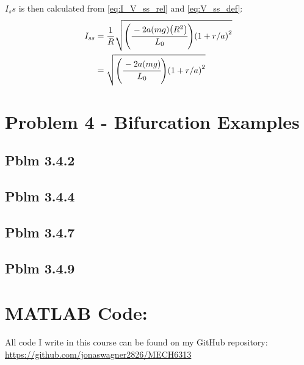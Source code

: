 \documentclass[letter]{article}
\begin{document}
$I_ss$ is then calculated from \eqref{eq:I_V_ss_rel} and \eqref{eq:V_ss_def}:
\begin{align}
	I_{ss}	&= \frac{1}{R} \sqrt{\qty(\cfrac{-2 a \qty(mg) \qty(R^2)}{L_0}) \qty(1+r/a)^2} \nonumber \\
			&= \sqrt{\qty(\cfrac{-2 a \qty(mg)}{L_0}) \qty(1+r/a)^2} \label{eq:I_ss_def}
\end{align}



\newpage
\section{Problem 4 - Bifurcation Examples}

\subsection{Pblm 3.4.2}



\subsection{Pblm 3.4.4}




\subsection{Pblm 3.4.7}




\subsection{Pblm 3.4.9}


\newpage
\appendix
\section{MATLAB Code:}
All code I write in this course can be found on my GitHub repository:\\
\href{https://github.com/jonaswagner2826/MECH6313}{https://github.com/jonaswagner2826/MECH6313}

\end{document}
